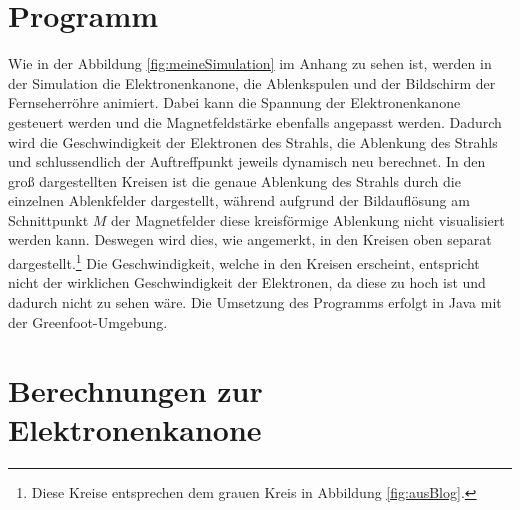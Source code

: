 \section{Programm}
Wie in der Abbildung \ref{fig:meineSimulation} im Anhang zu sehen ist, werden in der Simulation die Elektronenkanone, die Ablenkspulen und der Bildschirm der Fernseherröhre animiert. 
Dabei kann die Spannung der Elektronenkanone gesteuert werden und die Magnetfeldstärke ebenfalls angepasst werden.
Dadurch wird die Geschwindigkeit der Elektronen des Strahls, die Ablenkung des Strahls und schlussendlich der Auftreffpunkt jeweils dynamisch neu berechnet.
In den groß dargestellten Kreisen ist die genaue Ablenkung des Strahls durch die einzelnen Ablenkfelder dargestellt, während aufgrund der Bildauflösung am Schnittpunkt $M$ der Magnetfelder diese kreisförmige Ablenkung nicht visualisiert werden kann.   
Deswegen wird dies, wie angemerkt, in den Kreisen oben separat dargestellt.\footnote{Diese Kreise entsprechen dem grauen Kreis in Abbildung \ref{fig:ausBlog}.}
Die Geschwindigkeit, welche in den Kreisen erscheint, entspricht nicht der wirklichen Geschwindigkeit der Elektronen, da diese zu hoch ist und dadurch nicht zu sehen wäre.
Die Umsetzung des Programms erfolgt in Java mit der Greenfoot-Umgebung.
\label{sec:animation}

\section{Berechnungen zur Elektronenkanone}

\label{sec:tolle-section}
 
